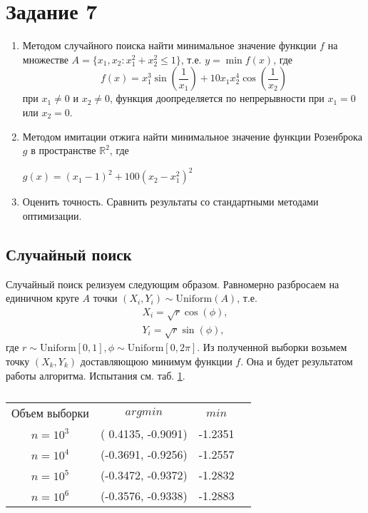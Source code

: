 \newpage
\section{Задание 7}

\begin{enumerate}
	\item Методом случайного поиска найти минимальное значение функции $f$ на 
    множестве $A = \{x_1, x_2 : x_1^2 + x_2^2 \leq 1\}$, т.е. $y = \min f(x)$, 
    где 
    \begin{equation*}
        f(x) = x_1^3\sin\left(\frac{1}{x_1}\right) + 
        10x_1 x_2^4\cos\left(\frac{1}{x_2}\right)
    \end{equation*}
    при $x_1 \neq 0$ и $x_2 \neq 0$, функция доопределяется по непрерывности 
    при $x_1 = 0$ или $x_2 = 0$.
    \item Методом имитации отжига найти минимальное значение функции Розенброка 
    $g$ в пространстве $\mathbb{R}^2$, где 
    \begin{center}
	    $g(x) = (x_1-1)^2+100(x_2-x_1^2)^2$
    \end{center}
    \item Оценить точность. Сравнить результаты со стандартными методами 
    оптимизации.
\end{enumerate}

\subsection{Случайный поиск}
    Случайный поиск релизуем следующим образом. Равномерно разбросаем на 
    единичном круге $A$ точки $(X_i,Y_i) \sim \mathrm{Uniform}(A)$, т.е.
    \begin{gather*}
        X_i = \sqrt{r} \cos(\phi),\\
        Y_i = \sqrt{r} \sin(\phi),
    \end{gather*}
    где $r \sim \mathrm{Uniform}[0,1], \phi \sim \mathrm{Uniform}[0,2\pi]$. Из 
    полученной выборки возьмем точку $(X_k,Y_k)$ доставляющюю минимум функции 
    $f$. Она и будет результатом работы алгоритма. Испытания см. таб. 
    \ref{randsearch}.

    \begin{table}[ht]
        \begin{tabular}{|cccc}
            Объем выборки & $argmin$           & $min$   \\[5pt]
            $n=10^3$      & ( 0.4135, -0.9091) & -1.2351 \\
            $n=10^4$      & (-0.3691, -0.9256) & -1.2557 \\
            $n=10^5$      & (-0.3472, -0.9372) & -1.2832 \\
            $n=10^6$      & (-0.3576, -0.9338) & -1.2883 \\
        \end{tabular}
        \caption{}
        \label{randsearch}
    \end{table}

